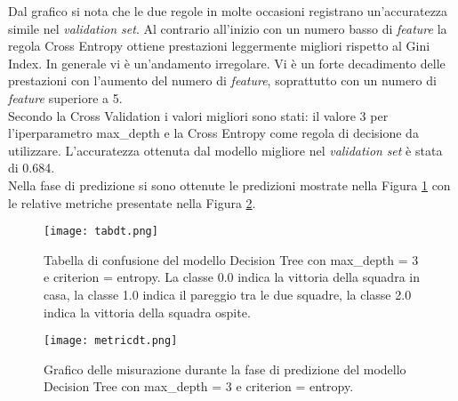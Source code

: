 Dal grafico si nota che le due regole in molte occasioni registrano un'accuratezza simile nel \emph{validation set}. Al contrario all'inizio con un numero basso di \emph{feature} la regola Cross Entropy ottiene prestazioni leggermente migliori rispetto al Gini Index. In generale vi è un'andamento irregolare. Vi è un forte decadimento delle prestazioni con l'aumento del numero di \emph{feature}, soprattutto con un numero di \emph{feature} superiore a 5.\\
Secondo la Cross Validation i valori migliori sono stati: il valore 3 per l'iperparametro \textsf{max\_depth} e la Cross Entropy come regola di decisione da utilizzare. L'accuratezza ottenuta dal modello migliore nel \emph{validation} \emph{set} è stata di 0.684.\\
Nella fase di predizione si sono ottenute le predizioni mostrate nella Figura \ref{fig:tabdt} con le relative metriche presentate nella Figura \ref{fig:dtmetrics}.
\begin{figure}[h]
	\begin{center}
		\texttt{[image: tabdt.png]}
		\caption{Tabella di confusione del modello Decision Tree con \textsf{max\_depth} = 3 e \textsf{criterion} = entropy. La classe 0.0 indica la vittoria della squadra in casa, la classe 1.0 indica il pareggio tra le due squadre, la classe 2.0 indica la vittoria della squadra ospite.
		} 
		\label{fig:tabdt}
	\end{center}
\end{figure}

\begin{figure}[]
	\begin{center}
		\texttt{[image: metricdt.png]}
		\caption{Grafico delle misurazione durante la fase di predizione del modello Decision Tree con \textsf{max\_depth} = 3 e \textsf{criterion} = entropy.
		} 
		\label{fig:dtmetrics}
	\end{center}
\end{figure}

